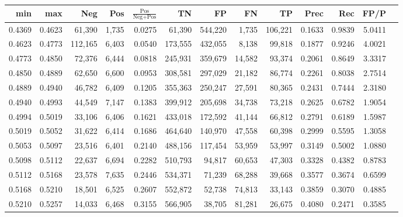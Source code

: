 \begin{tabular}{rrrrrrrrrrrrr}
\toprule
   min &    max &     Neg &   Pos & $\frac{\text{Pos}}{\text{Neg}+\text{Pos}}$ &      TN &      FP &      FN &      TP &   Prec &    Rec &   FP/P \\
\midrule
0.4369 & 0.4623 &  61,390 & 1,735 &                                     0.0275 &  61,390 & 544,220 &   1,735 & 106,221 & 0.1633 & 0.9839 & 5.0411 \\
0.4623 & 0.4773 & 112,165 & 6,403 &                                     0.0540 & 173,555 & 432,055 &   8,138 &  99,818 & 0.1877 & 0.9246 & 4.0021 \\
0.4773 & 0.4850 &  72,376 & 6,444 &                                     0.0818 & 245,931 & 359,679 &  14,582 &  93,374 & 0.2061 & 0.8649 & 3.3317 \\
0.4850 & 0.4889 &  62,650 & 6,600 &                                     0.0953 & 308,581 & 297,029 &  21,182 &  86,774 & 0.2261 & 0.8038 & 2.7514 \\
0.4889 & 0.4940 &  46,782 & 6,409 &                                     0.1205 & 355,363 & 250,247 &  27,591 &  80,365 & 0.2431 & 0.7444 & 2.3180 \\
0.4940 & 0.4993 &  44,549 & 7,147 &                                     0.1383 & 399,912 & 205,698 &  34,738 &  73,218 & 0.2625 & 0.6782 & 1.9054 \\
0.4994 & 0.5019 &  33,106 & 6,406 &                                     0.1621 & 433,018 & 172,592 &  41,144 &  66,812 & 0.2791 & 0.6189 & 1.5987 \\
0.5019 & 0.5052 &  31,622 & 6,414 &                                     0.1686 & 464,640 & 140,970 &  47,558 &  60,398 & 0.2999 & 0.5595 & 1.3058 \\
0.5053 & 0.5097 &  23,516 & 6,401 &                                     0.2140 & 488,156 & 117,454 &  53,959 &  53,997 & 0.3149 & 0.5002 & 1.0880 \\
0.5098 & 0.5112 &  22,637 & 6,694 &                                     0.2282 & 510,793 &  94,817 &  60,653 &  47,303 & 0.3328 & 0.4382 & 0.8783 \\
0.5112 & 0.5168 &  23,578 & 7,635 &                                     0.2446 & 534,371 &  71,239 &  68,288 &  39,668 & 0.3577 & 0.3674 & 0.6599 \\
0.5168 & 0.5210 &  18,501 & 6,525 &                                     0.2607 & 552,872 &  52,738 &  74,813 &  33,143 & 0.3859 & 0.3070 & 0.4885 \\
0.5210 & 0.5257 &  14,033 & 6,468 &                                     0.3155 & 566,905 &  38,705 &  81,281 &  26,675 & 0.4080 & 0.2471 & 0.3585 \\

\end{tabular}
